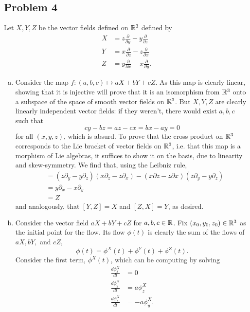 \documentclass{../mathnotes}
\begin{document}
\subsection*{Problem 4}
Let $X,Y,Z$ be the vector fields defined on $\mathbb{R}^3$ defined by
\begin{align*}
    X &= z\frac{\partial}{\partial y}-y\frac{\partial}{\partial z}\\
    Y &= x\frac{\partial}{\partial z}-z\frac{\partial}{\partial x}\\
    Z &= y\frac{\partial}{\partial x}-x\frac{\partial}{\partial y}.
\end{align*}
\begin{enumerate}[(a)]
    \item Consider the map $f:(a,b,c)\mapsto aX+bY+cZ$. As this map is clearly linear, showing
        that it is injective will prove that it is an isomorphism from $\mathbb{R}^3$ onto a subspace of
        the space of smooth vector fields on $\mathbb{R}^3$. But $X,Y,Z$ are clearly linearly independent
        vector fields: if they weren't, there would exist $a,b,c$ such that
        \[cy-bz=az-cx=bx-ay=0\]
        for all $(x,y,z)$, which is absurd. To prove that the cross product on $\mathbb{R}^3$ corresponds
        to the Lie bracket of vector fields on $\mathbb{R}^3$, i.e. that this map is a morphism of Lie
        algebras, it suffices to show it on the basis, due to linearity and skew-symmetry. We find
        that, using the Leibniz rule,
        \begin{align*}
            [X,Y] &= \left( z\partial_y-y\partial_z \right)(x\partial_z-z\partial_x) - (x\partial z-z\partial x)(z\partial_y-y\partial_z)\\
            &= y\partial_x - x \partial_y\\
            &= Z
        \end{align*}
        and analogously, that $[Y,Z]=X$ and $[Z,X]=Y$, as desired.
    \item Consider the vector field $aX+bY+cZ$ for $a,b,c\in\mathbb{R}$. Fix $(x_0,y_0,z_0)\in\mathbb{R}^3$
        as the initial point for the flow.
        Its flow $\phi(t)$ is clearly the sum of the flows of $aX,bY,$ and $cZ$,
        \[\phi(t)=\phi^X(t)+\phi^Y(t)+\phi^Z(t).\]
        Consider the first term, $\phi^X(t)$, which can be computing by solving
        \begin{align*}
            \frac{d\phi^X_x}{dt} &= 0\\
            \frac{d\phi^X_y}{dt} &= a\phi^X_z\\
            \frac{d\phi^X_z}{dt} &= -a\phi^X_y.

\end{align*}
\end{enumerate}
\end{document}
